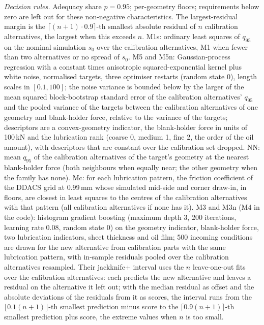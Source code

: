\documentclass[pdflatex,sn-basic]{sn-jnl}
\begin{document}
\emph{Decision rules.} Adequacy share $p=0.95$; per-geometry floors; requirements below zero are left out for these non-negative characteristics. The largest-residual margin is the $\lceil (n+1)\cdot 0.9\rceil$-th smallest absolute residual of $n$ calibration alternatives, the largest when this exceeds $n$. M1s: ordinary least squares of $q_{95}$ on the nominal simulation $s_0$ over the calibration alternatives, M1 when fewer than two alternatives or no spread of $s_0$. M5 and M5n: Gaussian-process regression with a constant times anisotropic squared-exponential kernel plus white noise, normalised targets, three optimiser restarts (random state 0), length scales in $[0.1, 100]$; the noise variance is bounded below by the larger of the mean squared block-bootstrap standard error of the calibration alternatives' $q_{95}$ and the pooled variance of the targets between the calibration alternatives of one geometry and blank-holder force, relative to the variance of the targets; descriptors are a convex-geometry indicator, the blank-holder force in units of 100\,kN and the lubrication rank (coarse 0, medium 1, fine 2, the order of the oil amount), with descriptors that are constant over the calibration set dropped. NN: mean $q_{95}$ of the calibration alternatives of the target's geometry at the nearest blank-holder force (both neighbours when equally near; the other geometry when the family has none). Mc: for each lubrication pattern, the friction coefficient of the DDACS grid at 0.99\,mm whose simulated mid-side and corner draw-in, in floors, are closest in least squares to the centres of the calibration alternatives with that pattern (all calibration alternatives if none has it). M3 and M3n (M4 in the code): histogram gradient boosting (maximum depth 3, 200 iterations, learning rate 0.08, random state 0) on the geometry indicator, blank-holder force, two lubrication indicators, sheet thickness and oil film; 500 incoming conditions are drawn for the new alternative from calibration parts with the same lubrication pattern, with in-sample residuals pooled over the calibration alternatives resampled. Their jackknife+ interval \citep{barber2021predictive} uses the $n$ leave-one-out fits over the calibration alternatives: each predicts the new alternative and leaves a residual on the alternative it left out; with the median residual as offset and the absolute deviations of the residuals from it as scores, the interval runs from the $\lfloor 0.1(n+1)\rfloor$-th smallest prediction minus score to the $\lceil 0.9(n+1)\rceil$-th smallest prediction plus score, the extreme values when $n$ is too small.
\end{document}
